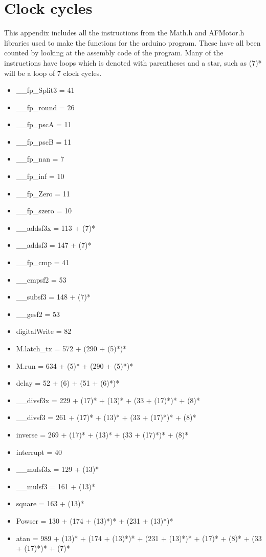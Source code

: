 \chapter{Clock cycles}
\label{chap:Clock cycles}
This appendix includes all the instructions from the Math.h and AFMotor.h libraries used to make the functions for the arduino program. These have all been counted by looking at the assembly code of the program. Many of the instructions have loops which is denoted with parentheses and a star, such as (7)* will be a loop of 7 clock cycles. 
\begin{itemize}
	\item \_\_fp\_Split3 = 41
	\item \_\_fp\_round = 26
	\item \_\_fp\_pscA = 11
	\item \_\_fp\_pscB = 11
	\item \_\_fp\_nan = 7
	\item \_\_fp\_inf = 10
	\item \_\_fp\_Zero = 11
	\item \_\_fp\_szero = 10
	\item \_\_addsf3x = 113 + (7)*
	\item \_\_addsf3 = 147 + (7)*
	\item \_\_fp\_cmp = 41
	\item \_\_cmpsf2 = 53
	\item \_\_subsf3 = 148 + (7)*
	\item \_\_gesf2 = 53
	\item digitalWrite = 82{\normalsize }
	\item M.latch\_tx = 572 + (290 + (5)*)*
	\item M.run = 634 + (5)* + (290 + (5)*)*
	\item delay = 52 + (6) + (51 + (6)*)*
	\item \_\_divsf3x = 229 + (17)* + (13)* + (33 + (17)*)* + (8)*
	\item \_\_divsf3 = 261 + (17)* + (13)* + (33 + (17)*)* + (8)*
	\item inverse = 269 + (17)* + (13)* + (33 + (17)*)* + (8)*
	\item interrupt = 40
	\item \_\_mulsf3x = 129 + (13)*
	\item \_\_mulsf3 = 161 + (13)*
	\item square = 163 + (13)*
	\item Powser = 130 + (174 + (13)*)* + (231 + (13)*)*
	\item atan = 989 + (13)* + (174 + (13)*)* + (231 + (13)*)* + (17)* + (8)* + (33 + (17)*)* + (7)*

\end{itemize}
